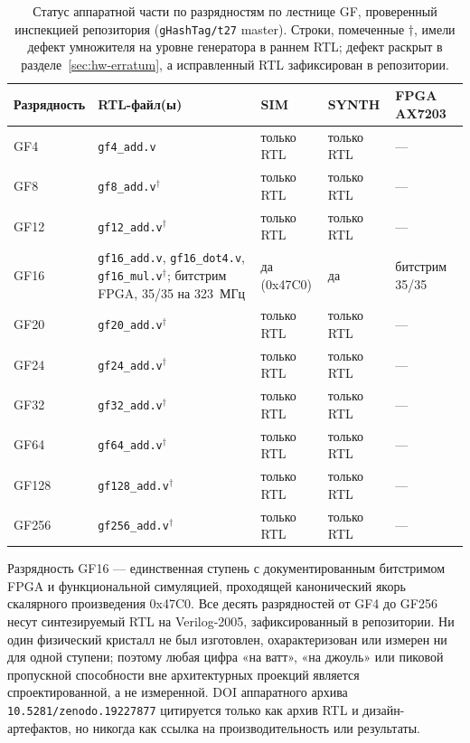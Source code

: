 \documentclass[11pt,a4paper]{article}
\theoremstyle{plain}
\begin{document}
\begin{table}[t]
\centering
\caption{Статус аппаратной части по разрядностям по лестнице GF, проверенный
инспекцией репозитория (\texttt{gHashTag/t27} master).
Строки, помеченные \(\dagger\), имели дефект умножителя на уровне генератора в
раннем RTL; дефект раскрыт в
разделе~\ref{sec:hw-erratum}, а исправленный RTL зафиксирован в репозитории.}
\label{tab:hwstatus}
\footnotesize
\setlength{\tabcolsep}{4pt}
\begin{tabularx}{\linewidth}{@{}l >{\raggedright\arraybackslash}X l l l@{}}
\toprule
Разрядность & RTL-файл(ы) & SIM & SYNTH & FPGA AX7203 \\
\midrule
GF4   & \texttt{gf4\_add.v}   & только RTL & только RTL & --- \\
GF8   & \texttt{gf8\_add.v}$^\dagger$   & только RTL & только RTL & --- \\
GF12  & \texttt{gf12\_add.v}$^\dagger$  & только RTL & только RTL & --- \\
GF16  & \texttt{gf16\_add.v}, \texttt{gf16\_dot4.v}, \texttt{gf16\_mul.v}$^\dagger$; битстрим FPGA, 35/35 на 323~МГц & да (0x47C0) & да & битстрим 35/35 \\
GF20  & \texttt{gf20\_add.v}$^\dagger$  & только RTL & только RTL & --- \\
GF24  & \texttt{gf24\_add.v}$^\dagger$  & только RTL & только RTL & --- \\
GF32  & \texttt{gf32\_add.v}$^\dagger$  & только RTL & только RTL & --- \\
GF64  & \texttt{gf64\_add.v}$^\dagger$  & только RTL & только RTL & --- \\
GF128 & \texttt{gf128\_add.v}$^\dagger$ & только RTL & только RTL & --- \\
GF256 & \texttt{gf256\_add.v}$^\dagger$ & только RTL & только RTL & --- \\
\bottomrule
\end{tabularx}
\end{table}

Разрядность GF16 --- единственная ступень с документированным битстримом FPGA и
функциональной симуляцией, проходящей канонический якорь скалярного произведения
0x47C0. Все десять разрядностей от GF4 до GF256 несут синтезируемый RTL на
Verilog-2005, зафиксированный в репозитории. Ни один физический кристалл не был
изготовлен, охарактеризован или измерен ни для одной ступени; поэтому любая цифра «на ватт»,
«на джоуль» или пиковой пропускной способности вне архитектурных проекций
является спроектированной, а не измеренной.
DOI аппаратного архива \texttt{10.5281/zenodo.19227877} цитируется только как
архив RTL и дизайн-артефактов, но никогда как ссылка на
производительность или результаты.
\end{document}
